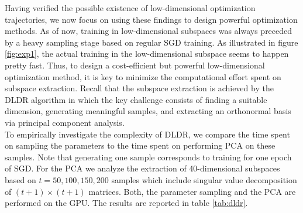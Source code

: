 \documentclass[11pt, a4paper]{article}
\begin{document}
Having verified the possible existence of low-dimensional optimization trajectories, we now focus on using these findings to design powerful optimization methods. As of now, training in low-dimensional subspaces was always preceded by a heavy sampling stage based on regular SGD training. As illustrated in figure \ref{fig:exp1}, the actual training in the low-dimensional subspace seems to happen pretty fast. Thus, to design a cost-efficient but powerful low-dimensional optimization method, it is key to minimize the computational effort spent on subspace extraction. Recall that the subspace extraction is achieved by the DLDR algorithm in which the key challenge consists of finding a suitable dimension, generating meaningful samples, and extracting an orthonormal basis via principal component analysis. \\

To empirically investigate the complexity of DLDR, we compare the time spent on sampling the parameters to the time spent on performing PCA on these samples. Note that generating one sample corresponds to training for one epoch of SGD. For the PCA we analyze the extraction of 40-dimensional subspaces based on $t=50, 100, 150, 200$ samples which include singular value decomposition of $(t+1) \times (t+1)$ matrices. Both, the parameter sampling and the PCA are performed on the GPU. The results are reported in table \ref{tab:dldr}. \\
\end{document}
